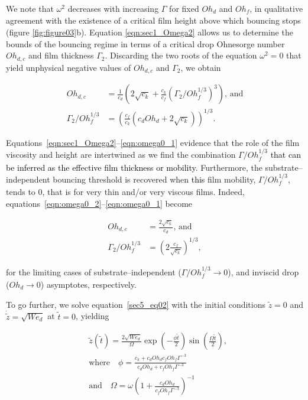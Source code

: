 \documentclass[]{jfm}
\newcommand{\revRev}[1]{\textcolor{black}{#1}}
\newcommand{\Ohd}{\mathit{Oh}_\mathit{d}}
\newcommand{\Ohf}{\mathit{Oh}_\mathit{f}}
\newcommand{\Wen}{\mathit{We}_\mathit{d}}
\begin{document}
	\noindent We note that $\omega^2$ decreases with increasing $\Gamma$ for fixed $\Ohd$ and $\Ohf$, in qualitative agreement with the existence of a critical film height above which bouncing stops (figure \ref{fig:figure03}b).
	Equation \eqref{eqn:sec1_Omega2} allows us to determine the bounds of the bouncing regime in terms of a critical drop Ohnesorge number $Oh_{d,c}$ and film thickness $\Gamma_2$. Discarding the two roots of the equation $\omega^2 = 0$ that yield unphysical negative values of $Oh_{d,c}$ and $\Gamma_2$, we obtain
	
	\begin{align}
		\label{eqn:omega0_2}
		Oh_{d,c} &= \frac{1}{c_d}\left(2\sqrt{c_k} + \frac{c_{k}}{c_{f}}\left(\Gamma_2/\Ohf^{1/3}\right)^3\right),\,\text{and}\\
		\label{eqn:omega0_1}
		\Gamma_2/\Ohf^{1/3} &= \left(\frac{c_{f}}{c_{k}}\left( c_{d} \Ohd + 2 \sqrt{c_{k}} \right)\right)^{1/3}.
	\end{align}
	
	\noindent Equations~\eqref{eqn:sec1_Omega2}--\eqref{eqn:omega0_1} evidence that the role of the film viscosity and height are intertwined as we find the combination $\Gamma/\Ohf^{1/3}$ \revRev{that can be inferred as the effective film thickness or mobility}.
	Furthermore, the substrate--independent bouncing threshold is recovered when \revRev{this} film mobility, $\Gamma/\Ohf^{1/3}$, tends to 0, that is for very thin and/or very viscous films. 
	Indeed, equations~\eqref{eqn:omega0_2}--\eqref{eqn:omega0_1} become
	
	\begin{align}
		\label{eqn:omega1_2}
		Oh_{d,c} &= \frac{2\sqrt{c_k} }{c_d},\,\text{and}\\
		\label{eqn:omega1_1}
		\Gamma_2/\Ohf^{1/3} &= \left(2\frac{c_{f}}{\sqrt{c_{k}}}\right)^{1/3},
	\end{align}
	
	\noindent for the limiting cases of substrate--independent ($\Gamma/\Ohf^{1/3} \to 0$), and inviscid drop ($\Ohd \to 0$) asymptotes, respectively.
	
	To go further, we solve equation~\eqref{sec5_eq02} with the initial conditions $\tilde{z} = 0$ and $\dot{\tilde{z}} = \sqrt{\Wen}$ at $\tilde{t} = 0$, yielding
	
	\begin{align}
		\label{eqn:displacement_Theory}
		&\tilde{z}(\tilde{t}) =  \frac{2 \sqrt{\Wen}} {\Omega}\exp\left(-\frac{\mathcal{\phi} \tilde{t}}{2}\right) \sin\left(\frac{\Omega\tilde{t}}{2}\right),\\
		\label{eqn:displacement_damper}
		&\text{where}\quad\mathcal{\phi} = \frac{c_k + c_d\Ohd c_f\Ohf\Gamma^{-3}}{c_d\Ohd+c_f\Ohf\Gamma^{-3}}\\
		\label{eqn:displacement_pulsation}
		&\text{and}\quad\Omega = \omega\left(1+\frac{c_d\Ohd}{c_f\Ohf\Gamma^{-3}}\right)^{-1}
	\end{align}
	
\end{document}
